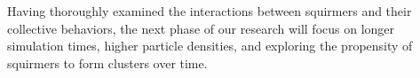\documentclass{article}
\begin{document}
Having thoroughly examined the interactions between squirmers and their collective behaviors, 
the next phase of our research will focus on longer simulation times, higher particle densities, 
and exploring the propensity of squirmers to form clusters over time.
\newpage

\nocite{*}


\end{document}
